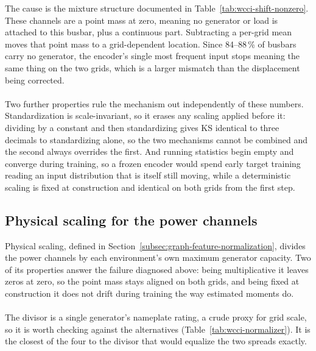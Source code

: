 \noindent The cause is the mixture structure documented in
Table~\ref{tab:wcci-shift-nonzero}. These channels are a point mass at zero,
meaning no generator or load is attached to this busbar, plus a continuous part.
Subtracting a per-grid mean moves that point mass to a grid-dependent location.
Since 84--88\,\% of busbars carry no generator, the encoder's single most
frequent input stops meaning the same thing on the two grids, which is a larger
mismatch than the displacement being corrected.
\\
\\
Two further properties rule the mechanism out independently of these numbers.
Standardization is scale-invariant, so it erases any scaling applied before it:
dividing by a constant and then standardizing gives KS identical to three
decimals to standardizing alone, so the two mechanisms cannot be combined and
the second always overrides the first. And running statistics begin empty and
converge during training, so a frozen encoder would spend early target training
reading an input distribution that is itself still moving, while a deterministic
scaling is fixed at construction and identical on both grids from the first
step.

\subsection{Physical scaling for the power channels}
\label{sec:wcci-physical-scaling}

Physical scaling, defined in Section~\ref{subsec:graph-feature-normalization},
divides the power channels by each environment's own maximum generator capacity.
Two of its properties answer the failure diagnosed above: being multiplicative it
leaves zeros at zero, so the point mass stays aligned on both grids, and being
fixed at construction it does not drift during training the way estimated moments
do.
\\
\\
The divisor is a single generator's nameplate rating, a crude proxy for grid
scale, so it is worth checking against the alternatives
(Table~\ref{tab:wcci-normalizer}). It is the closest of the four to the divisor
that would equalize the two spreads exactly.

